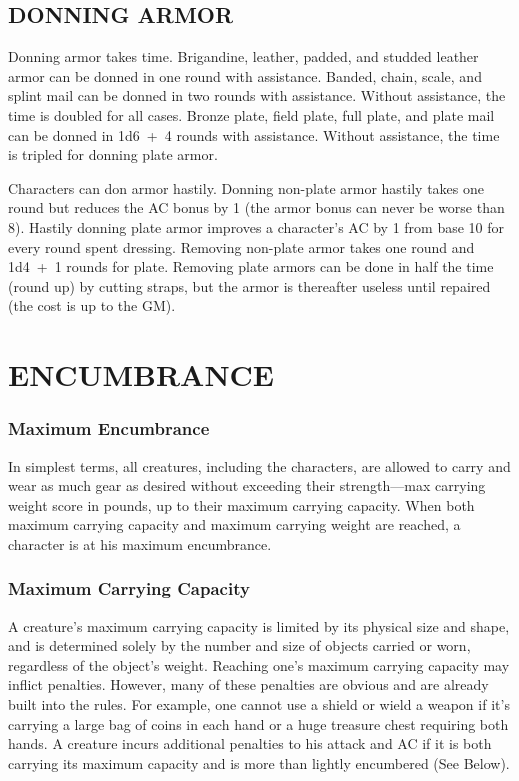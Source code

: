 \begin{multicols}{2}
\begin{minipage}{\columnwidth}
\end{minipage}

\subsection*{DONNING ARMOR}

Donning armor takes time.  Brigandine, leather, padded, and studded leather armor can be donned in one round with assistance.  Banded, chain, scale, and splint mail can be donned in two rounds with assistance.  Without assistance, the time is doubled for all cases.  Bronze plate, field plate, full plate, and plate mail can be donned in 1d6~+~4 rounds with assistance.  Without assistance, the time is tripled for donning plate armor.

Characters can don armor hastily.  Donning non-plate armor hastily takes one round but reduces the AC bonus by 1 (the armor bonus can never be worse than 8).  Hastily donning plate armor improves a character's AC by 1 from base 10 for every round spent dressing.  Removing non-plate armor takes one round and 1d4~+~1 rounds for plate.  Removing plate armors can be done in half the time (round up) by cutting straps, but the armor is thereafter useless until repaired (the cost is up to the GM). 

\section{ENCUMBRANCE}

\subsubsection*{Maximum Encumbrance}

In simplest terms, all creatures, including the characters, are allowed to carry and wear as much gear as desired without exceeding their strength---max carrying weight score in pounds, up to their maximum carrying capacity.  When both maximum carrying capacity and maximum carrying weight are reached, a character is at his maximum encumbrance. 

\subsubsection*{Maximum Carrying Capacity}

A creature's maximum carrying capacity is limited by its physical size and shape, and is determined solely by the number and size of objects carried or worn, regardless of the object's weight.  Reaching one's maximum carrying capacity may inflict penalties.  However, many of these penalties are obvious and are already built into the rules.  For example, one cannot use a shield or wield a weapon if it's carrying a large bag of coins in each hand or a huge treasure chest requiring both hands.  A creature incurs additional penalties to his attack and AC if it is both carrying its maximum capacity and is more than lightly encumbered (See Below). 


\end{multicols}
